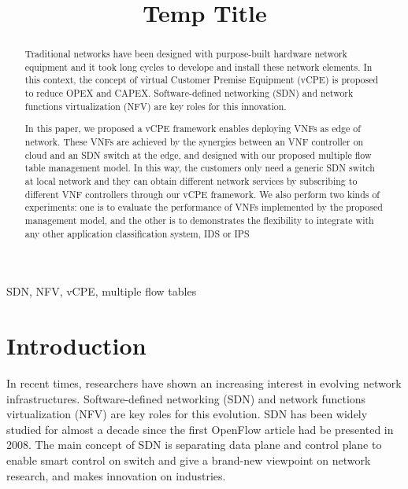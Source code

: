 \documentclass[conference]{IEEEtran}
\begin{document}
\title{Temp Title}

\author{

}

\maketitle

\begin{abstract}
Traditional networks have been designed with purpose-built hardware network equipment and it took long cycles to develope and install these network elements. In this context, the concept of virtual Customer Premise Equipment (vCPE) is proposed to reduce OPEX and CAPEX. Software-defined networking (SDN) and network functions virtualization (NFV) are key roles for this innovation.

In this paper, we proposed a vCPE framework enables deploying VNFs as edge of network. These VNFs are achieved by the synergies between an VNF controller on cloud and an SDN switch at the edge, and designed with our proposed multiple flow table management model. In this way, the customers only need a generic SDN switch at local network and they can obtain different network services by subscribing to different VNF controllers through our vCPE framework. We also perform two kinds of experiments: one is to evaluate the performance of VNFs implemented by the proposed management model, and the other is to demonstrates the flexibility to integrate with any other application classification system, IDS or IPS



\end{abstract}

\begin{IEEEkeywords}
SDN, NFV, vCPE, multiple flow tables
\end{IEEEkeywords}

\IEEEpeerreviewmaketitle{}





\section{Introduction}
In recent times, researchers have shown an increasing interest in evolving network infrastructures.
Software-defined networking (SDN) and network functions virtualization (NFV) are key roles for this evolution.
SDN \cite{sdn-mckeown-2009-talk, sdn-newnorm, sdn-road, sdn-compre-survey} has been widely studied for almost a decade since the first OpenFlow \cite{openflow-mckeown-2008, openflow-spec} article had be presented in 2008.
The main concept of SDN is separating data plane and control plane to enable smart control on switch and give a brand-new viewpoint on network research, and makes innovation on industries.
\end{document}
